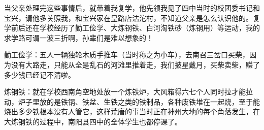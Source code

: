 当父亲处理完这些事情后，就带着我复学，他先领我见了四中当时的校团委书记和宝兴，请他多关照我，和宝兴家在皇路店沽沱村，不知道父亲是怎么认识他的。复学前后还在学校经历了勤工俭学、大炼钢铁、白河淘铁砂（炼钢用）等运动，我的求学路可谓一波三折啊，孙辈们是难以想象的！

勤工俭学：五人一辆独轮木质手推车（当时称之为小车），去南召三岔口买柴，因为没有大路走，只能从全是乱石的河滩里推着走，我们披星戴月，买柴卖柴，赚了多少钱已经记不清啦。

炼钢铁：就在学校西南角空地处放一个炼铁炉，大风箱得六七个人同时拉才能拉动，炉子里放的是铁锅、铁盆、生铁之类的铁制品，各种废铁堆在一起烧，至于能烧出多少铁根本没有人管它，这样荒唐的事当时正在神州大地的每个角落发生，在大炼钢铁的过程中，南阳县四中的全体学生也都停课了。

